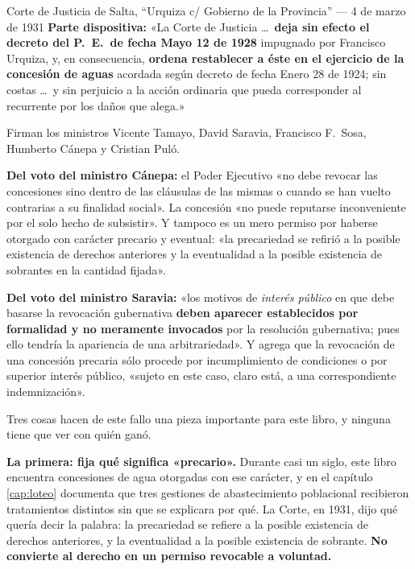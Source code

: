 \begin{ficha}{Corte de Justicia de Salta, ``Urquiza c/ Gobierno de la Provincia'' --- 4 de marzo de 1931}
\textbf{Parte dispositiva:} «La Corte de Justicia \ldots\ \textbf{deja sin efecto el decreto
del P.\ E.\ de fecha Mayo 12 de 1928} impugnado por Francisco Urquiza, y, en consecuencia,
\textbf{ordena restablecer a éste en el ejercicio de la concesión de aguas} acordada según
decreto de fecha Enero 28 de 1924; sin costas \ldots\ y sin perjuicio a la acción ordinaria
que pueda corresponder al recurrente por los daños que alega.»

Firman los ministros Vicente Tamayo, David Saravia, Francisco F.\ Sosa, Humberto Cánepa y
Cristian Puló.

\textbf{Del voto del ministro Cánepa:} el Poder Ejecutivo «no debe revocar las concesiones
sino dentro de las cláusulas de las mismas o cuando se han vuelto contrarias a su finalidad
social». La concesión «no puede reputarse inconveniente por el solo hecho de subsistir». Y
tampoco es un mero permiso por haberse otorgado con carácter precario y eventual: «la
precariedad se refirió a la posible existencia de derechos anteriores y la eventualidad a la
posible existencia de sobrantes en la cantidad fijada».

\textbf{Del voto del ministro Saravia:} «los motivos de \textit{interés público} en que debe
basarse la revocación gubernativa \textbf{deben aparecer establecidos por formalidad y no
meramente invocados} por la resolución gubernativa; pues ello tendría la apariencia de una
arbitrariedad». Y agrega que la revocación de una concesión precaria sólo procede por
incumplimiento de condiciones o por superior interés público, «sujeto en este caso, claro
está, a una correspondiente indemnización».
\end{ficha}

Tres cosas hacen de este fallo una pieza importante para este libro, y ninguna tiene que ver
con quién ganó.

\textbf{La primera: fija qué significa «precario».} Durante casi un siglo, este libro
encuentra concesiones de agua otorgadas con ese carácter, y en el capítulo \ref{cap:loteo} documenta que
tres gestiones de abastecimiento poblacional recibieron tratamientos distintos sin que se
explicara por qué. La Corte, en 1931, dijo qué quería decir la palabra: la precariedad se
refiere a la posible existencia de derechos anteriores, y la eventualidad a la posible
existencia de sobrante. \textbf{No convierte al derecho en un permiso revocable a voluntad.}


